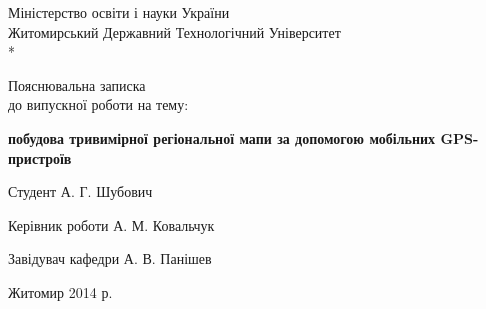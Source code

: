 \documentclass[simple,a4paper,14pt,ukrainian,utf8]{eskdtext}
\begin{document}

  \begin{titlepage}
    \fontsize{10pt}{12pt}\selectfont
    \newpage

    \begin{center}
        Міністерство освіти і науки України \\
        \vspace{1em}
        Житомирський Державний Технологічний Університет \\*
    \end{center}

    \vspace{8em}

    \vspace{1em}

    \vspace{8em}

    \begin{center}
        \Large Пояснювальна записка \\ до випускної роботи на тему:
    \end{center}

    \vspace{2.5em}

    \begin{center}
        \Large{\textbf{побудова тривимірної регіональної мапи за допомогою мобільних GPS-пристроїв}}
    \end{center}

    \vspace{6em}

    \begin{flushleft}
        Студент \hrulefill А. Г. Шубович \\

        \vspace{1.5em}

        Керівник роботи \hrulefill А. М. Ковальчук \\

        \vspace{1.5em}

        Завідувач кафедри \hrulefill А. В. Панішев \\
    \end{flushleft}

    \vspace{\fill}

    \begin{center}
        Житомир 2014 р.
    \end{center}

  \end{titlepage}
\end{document}
